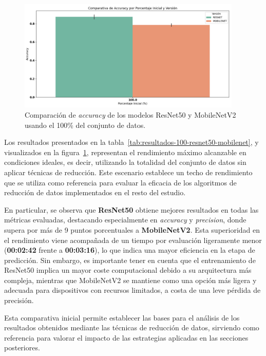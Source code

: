 \begin{figure}[htp]
    \centering
    \includegraphics[width=0.95\textwidth]{imagenes/evaluaciones/comparacion_modelos_100}
    \caption{Comparación de \textit{accuracy} de los modelos ResNet50 y MobileNetV2 usando el 100\% del conjunto de datos.}
    \label{fig:comparacion_modelos_100}
\end{figure}

Los resultados presentados en la tabla~\ref{tab:resultados-100-resnet50-mobilenet}, y visualizados en la figura~\ref{fig:comparacion_modelos_100},
representan el rendimiento máximo alcanzable en condiciones ideales,
es decir, utilizando la totalidad del conjunto de datos sin aplicar técnicas de reducción.
Este escenario establece un techo de rendimiento que se utiliza como referencia para evaluar la eficacia de
los algoritmos de reducción de datos implementados en el resto del estudio.

En particular, se observa que \textbf{ResNet50} obtiene mejores resultados en todas las métricas evaluadas,
destacando especialmente en \textit{accuracy} y \textit{precision}, donde supera por más de 9 puntos porcentuales a \textbf{MobileNetV2}.
Esta superioridad en el rendimiento viene acompañada de un tiempo por evaluación ligeramente menor (\textbf{00:02:42} frente a \textbf{00:03:16}),
lo que indica una mayor eficiencia en la etapa de predicción.
Sin embargo, es importante tener en cuenta que el entrenamiento de ResNet50 implica un mayor coste computacional debido a su arquitectura más compleja,
mientras que MobileNetV2 se mantiene como una opción más ligera y adecuada para dispositivos con recursos limitados, a costa de una leve pérdida de precisión.

Esta comparativa inicial permite establecer las bases para el análisis de los resultados obtenidos mediante las técnicas de reducción de datos,
sirviendo como referencia para valorar el impacto de las estrategias aplicadas en las secciones posteriores.


